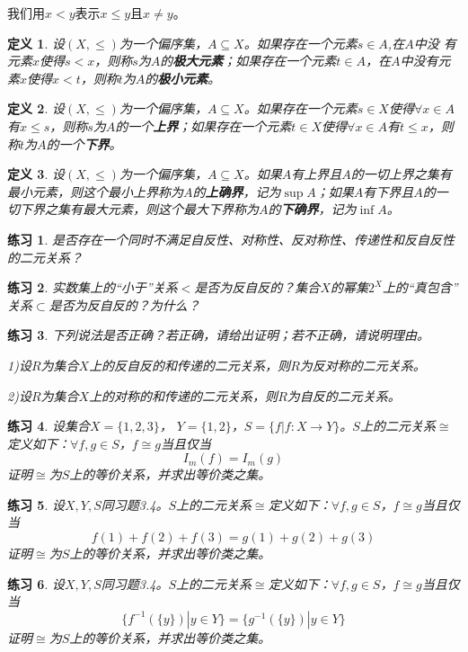 \documentclass{book}[oneside]
\newtheorem{Def}{定义}[chapter]
\newtheorem{Exercise}{练习}[chapter]
\begin{document}
\begin{CJK*}{UTF8}{gbsn}
  我们用$x<y$表示$x\leq y$且$x\neq y$。
    \begin{Def}
    设$(X,\leq)$为一个偏序集，$A\subseteq X$。如果存在一个元素$s\in A$,在$A$中没
    有元素$x$使得$s < x$，则称$s$为$A$的{\bfseries 极大元素}；如果存在一个元素$t\in A$，在$A$中没有元素$x$使得$x < t$，则称$t$为$A$的{\bfseries 极小元素}。
  \end{Def}

    \begin{Def}
    设$(X,\leq)$为一个偏序集，$A\subseteq X$。如果存在一个元素$s\in X$使得$\forall x \in A$有$x \leq s$，则称$s$为$A$的一个{\bfseries 上界}；如果存在一个元素$t\in X$使得$\forall x \in A$有$t \leq x$，则称$t$为$A$的一个{\bfseries 下界}。
  \end{Def}
    \begin{Def}
      设$(X,\leq)$为一个偏序集，$A\subseteq X$。如果$A$有上界且$A$的一切上界之集有最小元素，则这个最小上界称为$A$的{\bfseries 上确界}，记为$\sup A$；如果$A$有下界且$A$的一切下界之集有最大元素，则这个最大下界称为$A$的{\bfseries 下确界}，记为$\inf A$。
  \end{Def}



  \begin{Exercise}
  是否存在一个同时不满足自反性、对称性、反对称性、传递性和反自反性的二元关系？    
  \end{Exercise}
  \begin{Exercise}
  实数集上的“小于”关系$<$是否为反自反的？集合$X$的幂集$2^X$上的“真包含”
  关系$\subset$是否为反自反的？为什么？    
  \end{Exercise}

  \begin{Exercise}
  下列说法是否正确？若正确，请给出证明；若不正确，请说明理由。
  
  1)设$R$为集合$X$上的反自反的和传递的二元关系，则$R$为反对称的二元关系。
  
  2)设$R$为集合$X$上的对称的和传递的二元关系，则$R$为自反的二元关系。    
  \end{Exercise}

    \begin{Exercise}
  设集合$X = \{1,2,3\}$， $Y = \{1,2\}$，$S = \{f|f:X \to Y\}$。$S$上的二元关系$\cong$定义如下：$\forall f,g\in S$，$f \cong g$当且仅当\[I_m(f) = I_m(g)\]证明$\cong$为$S$上的等价关系，并求出等价类之集。    
  \end{Exercise}
  \begin{Exercise}
  设$X, Y, S$同习题3.4。$S$上的二元关系$\cong$定义如下：$\forall f,g\in S$，$f \cong g$当且仅当\[f(1) + f(2) + f(3) = g(1) + g(2) + g(3)\]证明$\cong$为$S$上的等价关系，并求出等价类之集。    
  \end{Exercise}
 \begin{Exercise}
  设$X, Y, S$同习题3.4。$S$上的二元关系$\cong$定义如下：$\forall f,g\in S$，$f \cong g$当且仅当\[\{f^{-1}(\{y\}) | y \in Y\} = \{g^{-1}(\{y\})|y \in Y\}\]证明$\cong$为$S$上的等价关系，并求出等价类之集。  
\end{Exercise}


\end{CJK*}
\end{document}
